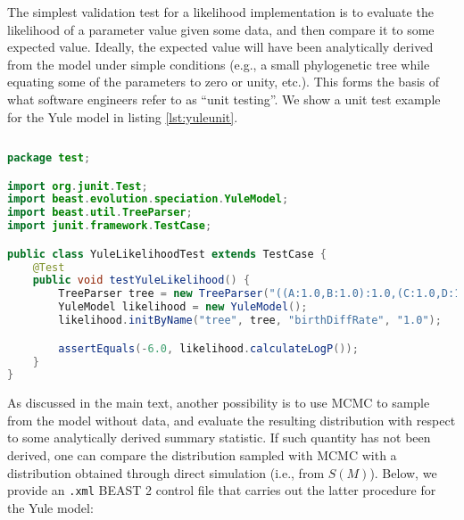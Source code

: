 \documentclass[oneside]{article}
\begin{document}
The simplest validation test for a likelihood implementation is to
evaluate the likelihood of a parameter value given some
data, and then compare it to some expected value.
Ideally, the expected value will have been analytically derived from the
model under simple conditions (e.g., a small phylogenetic tree while
equating some of the parameters to zero or unity, etc.).
This forms the basis of what software engineers refer to as ``unit testing''.
We show a unit test example for the Yule model in listing \ref{lst:yuleunit}.

{\small
\vspace{2cm}
\singlespacing
\begin{lstlisting}[language=Java, caption=Java unit test for Yule model
  likelihood function given a small phylogenetic tree.,label={lst:yuleunit}]
  
package test;

import org.junit.Test;
import beast.evolution.speciation.YuleModel;
import beast.util.TreeParser;
import junit.framework.TestCase;

public class YuleLikelihoodTest extends TestCase {
    @Test
    public void testYuleLikelihood() {
        TreeParser tree = new TreeParser("((A:1.0,B:1.0):1.0,(C:1.0,D:1.0):1.0);");
        YuleModel likelihood = new YuleModel();
        likelihood.initByName("tree", tree, "birthDiffRate", "1.0");

        assertEquals(-6.0, likelihood.calculateLogP());
    }
}
\end{lstlisting}
}

As discussed in the main text, another possibility is to use MCMC to
sample from the model without data, and evaluate the resulting
distribution with respect to some analytically derived summary
statistic.
If such quantity has not been derived, one can compare the
distribution sampled with MCMC with a distribution obtained through
direct simulation (i.e., from $S(M)$).
Below, we provide an \texttt{.xml} BEAST 2 control file that carries
out the latter procedure for the Yule model:
\end{document}

